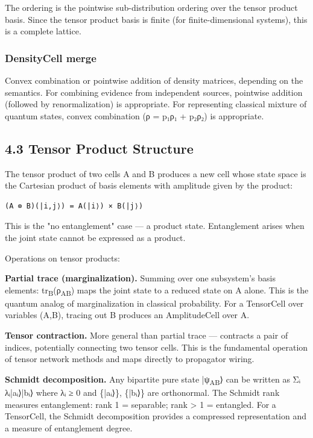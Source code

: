 \documentclass[11pt]{article}
\begin{document}
The ordering is the pointwise sub-distribution ordering over the tensor product
basis. Since the tensor product basis is finite (for finite-dimensional systems),
this is a complete lattice.
\subsubsection{DensityCell merge}
\label{sec:org530aa3b}
Convex combination or pointwise addition of density matrices, depending on the
semantics. For combining evidence from independent sources, pointwise addition
(followed by renormalization) is appropriate. For representing classical mixture
of quantum states, convex combination (ρ = p₁ρ₁ + p₂ρ₂) is appropriate.
\subsection{4.3 Tensor Product Structure}
\label{sec:org4358efb}

The tensor product of two cells A and B produces a new cell whose state space
is the Cartesian product of basis elements with amplitude given by the product:

\begin{verbatim}
(A ⊗ B)(|i,j⟩) = A(|i⟩) × B(|j⟩)
\end{verbatim}

This is the "no entanglement" case --- a product state. Entanglement arises when
the joint state cannot be expressed as a product.

Operations on tensor products:

\textbf{Partial trace (marginalization).} Summing over one subsystem's basis elements:
tr\textsubscript{B}(ρ\textsubscript{AB}) maps the joint state to a reduced state on A alone. This is the
quantum analog of marginalization in classical probability. For a TensorCell
over variables (A,B), tracing out B produces an AmplitudeCell over A.

\textbf{Tensor contraction.} More general than partial trace --- contracts a pair of
indices, potentially connecting two tensor cells. This is the fundamental
operation of tensor network methods and maps directly to propagator wiring.

\textbf{Schmidt decomposition.} Any bipartite pure state |ψ\textsubscript{AB}⟩ can be written as
Σᵢ λᵢ|aᵢ⟩|bᵢ⟩ where λᵢ ≥ 0 and \{|aᵢ⟩\}, \{|bᵢ⟩\} are orthonormal. The
Schmidt rank measures entanglement: rank 1 = separable; rank > 1 = entangled.
For a TensorCell, the Schmidt decomposition provides a compressed representation
and a measure of entanglement degree.
\end{document}
